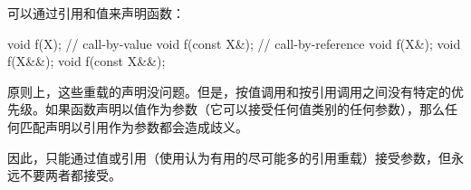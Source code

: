 可以通过引用和值来声明函数：

\begin{cppcode}
void f(X); // call-by-value
void f(const X&); // call-by-reference
void f(X&);
void f(X&&);
void f(const X&&);
\end{cppcode}

原则上，这些重载的声明没问题。但是，按值调用和按引用调用之间没有特定的优先级。如果函数声明以值作为参数（它可以接受任何值类别的任何参数），那么任何匹配声明以引用作为参数都会造成歧义。

因此，只能通过值或引用（使用认为有用的尽可能多的引用重载）接受参数，但永远不要两者都接受。


































































